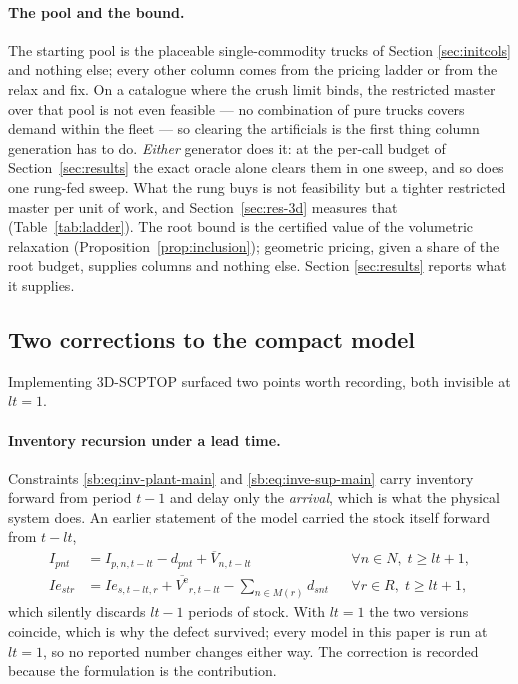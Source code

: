\paragraph{The pool and the bound.}
The starting pool is the placeable single-commodity trucks of Section
\ref{sec:initcols} and nothing else; every other column comes from the
pricing ladder or from the relax and fix. On a catalogue where the crush
limit binds, the restricted master over that pool is not even feasible
--- no combination of pure trucks covers demand within the fleet --- so
clearing the artificials is the first thing column generation has to do.
\emph{Either} generator does it: at the per-call budget of
Section~\ref{sec:results} the exact oracle alone clears them in one
sweep, and so does one rung-fed sweep. What the rung buys is not
feasibility but a tighter restricted master per unit of work, and
Section~\ref{sec:res-3d} measures that
(Table~\ref{tab:ladder}). The root bound is the certified value of the
volumetric relaxation (Proposition~\ref{prop:inclusion}); geometric
pricing, given a share of the root budget, supplies columns and nothing
else. Section \ref{sec:results} reports what it supplies.

\subsection{Two corrections to the compact model}
\label{sec:corrections}

Implementing 3D-SCPTOP surfaced two points worth recording, both
invisible at $lt=1$.

\paragraph{Inventory recursion under a lead time.}
Constraints \eqref{sb:eq:inv-plant-main} and
\eqref{sb:eq:inve-sup-main} carry inventory forward from period $t-1$
and delay only the \emph{arrival}, which is what the physical system
does. An earlier statement of the model carried the stock itself
forward from $t-lt$,
\begin{align}
I_{pnt}  &=I_{p,n,t-lt}-d_{pnt}+\overline{V}_{n,t-lt}
    &&\forall n\in N,\; t\ge lt+1,
    \label{eq:fix-plant}\\
Ie_{str} &=Ie_{s,t-lt,r}+\overline{V^{\mathrm{e}}}_{r,t-lt}
          -\textstyle\sum_{n\in M(r)} d_{snt}
    &&\forall r\in R,\; t\ge lt+1,
    \label{eq:fix-sup}
\end{align}
which silently discards $lt-1$ periods of stock. With $lt=1$ the two
versions coincide, which is why the defect survived; every model in
this paper is run at $lt=1$, so no reported number changes either way.
The correction is recorded because the formulation is the contribution.

